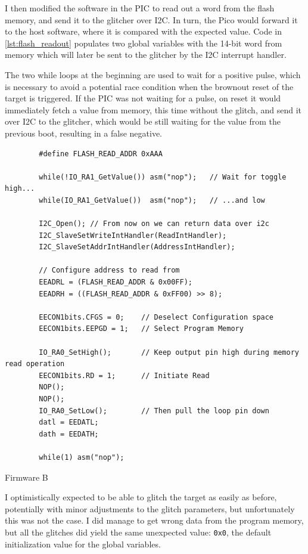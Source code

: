 \documentclass[a4paper,english,twoside,10pt]{article}
\begin{document}
I then modified the software in the PIC to read out a word from the flash memory, and send it to the glitcher over I2C. In turn, the Pico would forward it to the host software, where it is compared with the expected value. Code in \autoref{lst:flash_readout} populates two global variables with the 14-bit word from memory which will later be sent to the glitcher by the I2C interrupt handler.

The two while loops at the beginning are used to wait for a positive pulse, which is necessary to avoid a potential race condition when the brownout reset of the target is triggered. If the PIC was not waiting for a pulse, on reset it would immediately fetch a value from memory, this time without the glitch, and send it over I2C to the glitcher, which would be still waiting for the value from the previous boot, resulting in a false negative.

\begin{flushleft}
	\captionsetup{type=listing}
	\begin{verbatim}
		#define FLASH_READ_ADDR 0xAAA
	
		while(!IO_RA1_GetValue()) asm("nop");   // Wait for toggle high...
		while(IO_RA1_GetValue())  asm("nop");   // ...and low
	
		I2C_Open(); // From now on we can return data over i2c
		I2C_SlaveSetWriteIntHandler(ReadIntHandler);
		I2C_SlaveSetAddrIntHandler(AddressIntHandler);
	
		// Configure address to read from
		EEADRL = (FLASH_READ_ADDR & 0x00FF);
		EEADRH = ((FLASH_READ_ADDR & 0xFF00) >> 8);
	
		EECON1bits.CFGS = 0;    // Deselect Configuration space
		EECON1bits.EEPGD = 1;   // Select Program Memory
	
		IO_RA0_SetHigh();       // Keep output pin high during memory read operation
		EECON1bits.RD = 1;      // Initiate Read
		NOP();
		NOP();
		IO_RA0_SetLow();        // Then pull the loop pin down
		datl = EEDATL;
		dath = EEDATH;
	
		while(1) asm("nop");
	\end{verbatim}
	\caption{Firmware B}\label{lst:flash_readout}
\end{flushleft}

I optimistically expected to be able to glitch the target as easily as before, potentially with minor adjustments to the glitch parameters, but unfortunately this was not the case. I did manage to get wrong data from the program memory, but all the glitches did yield the same unexpected value: \texttt{0x0}, the default initialization value for the global variables.
\end{document}
